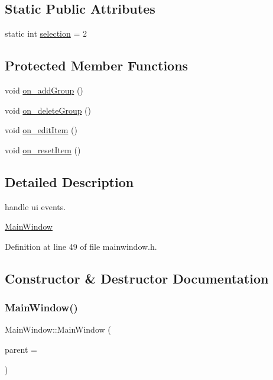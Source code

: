 \subsection*{Static Public Attributes}
\begin{DoxyCompactItemize}
\item 
static int \mbox{\hyperlink{class_main_window_a911848dbb7d268519126fd35326d8f44}{selection}} = 2
\end{DoxyCompactItemize}
\subsection*{Protected Member Functions}
\begin{DoxyCompactItemize}
\item 
void \mbox{\hyperlink{class_main_window_a16f8da8df766a6b3fb2be1a93d6a3a49}{on\+\_\+add\+Group}} ()
\item 
void \mbox{\hyperlink{class_main_window_a6b3dcc79316502d1d6ecb230312e62c8}{on\+\_\+delete\+Group}} ()
\item 
void \mbox{\hyperlink{class_main_window_a5f6c4aa27d5540a3e7f17d8fd88ded3f}{on\+\_\+edit\+Item}} ()
\item 
void \mbox{\hyperlink{class_main_window_a8fde7b67c704217df22de4576f741e21}{on\+\_\+reset\+Item}} ()
\end{DoxyCompactItemize}


\subsection{Detailed Description}
handle ui events. 

\mbox{\hyperlink{class_main_window}{Main\+Window}} 

Definition at line 49 of file mainwindow.\+h.



\subsection{Constructor \& Destructor Documentation}
\mbox{\label{class_main_window_a8b244be8b7b7db1b08de2a2acb9409db}} 
\subsubsection{\texorpdfstring{MainWindow()}{MainWindow()}}
{\footnotesize\ttfamily Main\+Window\+::\+Main\+Window (\begin{DoxyParamCaption}\item[{Q\+Widget $\ast$}]{parent = {} }\end{DoxyParamCaption})\hspace{0.3cm}{\ttfamily [explicit]}}

